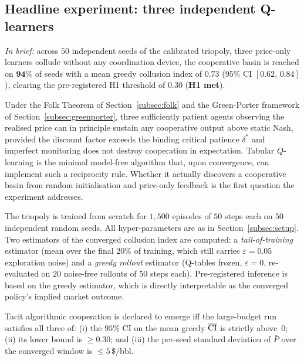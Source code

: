 \subsection{Headline experiment: three independent Q-learners}
\label{subsec:headline}

\emph{In brief:} across $50$ independent seeds of the calibrated
triopoly, three price-only learners collude without any coordination
device, the cooperative basin is reached on $\mathbf{94\%}$ of seeds
with a mean greedy collusion index of $\mathbf{0.73}$ ($95\%$ CI
$[0.62,\,0.84]$), clearing the pre-registered H1 threshold of $0.30$
(\textbf{H1 met}).

Under the Folk Theorem of Section~\ref{subsec:folk} and the Green-Porter
framework of Section~\ref{subsec:greenporter}, three sufficiently patient agents
observing the realised price can in principle sustain any
cooperative output above static Nash, provided the discount factor
exceeds the binding critical patience $\delta^\ast$ and imperfect
monitoring does not destroy cooperation in expectation. Tabular
$Q$-learning is the minimal model-free algorithm that, upon
convergence, can implement such a reciprocity rule. Whether it
actually discovers a cooperative basin from random
initialisation and price-only feedback is the first question the
experiment addresses.

The triopoly is trained from scratch for $1{,}500$ episodes of
$50$ steps each on $50$ independent random seeds. All
hyper-parameters are as in Section~\ref{subsec:setup}. Two
estimators of the converged collusion index are computed: a
\emph{tail-of-training} estimator (mean over the final $20\%$ of
training, which still carries $\varepsilon = 0.05$ exploration
noise) and a \emph{greedy rollout} estimator (Q-tables frozen,
$\varepsilon = 0$, re-evaluated on $20$ noise-free rollouts of
$50$ steps each). Pre-registered inference is based on the greedy
estimator, which is directly interpretable as the converged
policy's implied market outcome.

\begin{criterion*}
Tacit algorithmic cooperation is declared to emerge iff the
large-budget run satisfies all three of: \textup{(i)} the $95\%$
CI on the mean greedy $\overline{\mathrm{CI}}$ is strictly above~$0$;
\textup{(ii)} its lower bound is $\geq 0.30$; and
\textup{(iii)} the per-seed standard deviation of $\bar{P}$ over
the converged window is $\leq 5\,\$\text{/bbl}$.
\end{criterion*}

